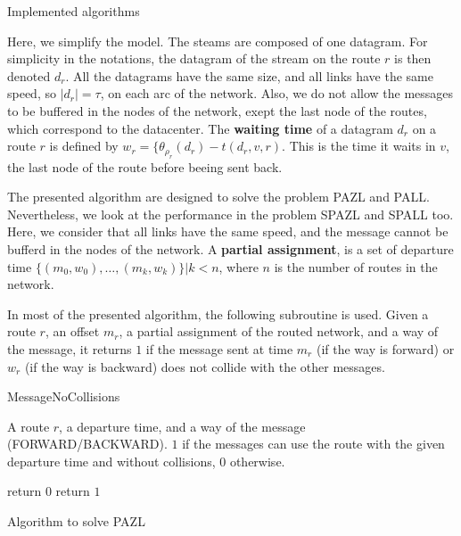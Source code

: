 \documentclass[10pt]{article}
\begin{document}
  \begin{section}{Implemented algorithms}
  
  \begin{subsection}
   Here, we simplify the model.
   The steams are composed of one datagram. For simplicity in the notations, the datagram of the stream on the route $r$ is then denoted $d_r$. All the datagrams have the same size, and all links have the same speed, so $|d_r| =\tau$, on each arc of the network.
   Also, we do not allow the messages to be buffered in the nodes of the network, exept the last node of the routes, which correspond to the datacenter.
   The \textbf{waiting time} of a datagram $d_r$ on a route $r$ is defined by $w_r = \{\theta_{\rho_r}(d_r) - t(d_r,v,r)$. This is the time it waits in $v$, the last node of the route before beeing sent back.
   
  \end{subsection}

  The presented algorithm are designed to solve the problem PAZL and PALL. Nevertheless, we look at the performance in the problem SPAZL and SPALL too.
  Here, we consider that all  links have the same speed, and the message cannot be bufferd in the nodes of the network. 
  A \textbf{partial assignment}, is a set of departure time $\{(m_0,w_0),\ldots,(m_k,w_k)\}|k<n$, where $n$ is the number of routes in the network.
  
   
   
  In most of the presented algorithm, the following subroutine is used. Given a route $r$, an offset $m_r$, a partial assignment of the routed network, and a way of the message, it returns $1$ if the message sent at time $m_r$ (if the way is forward) or $w_r$ (if the way is backward)  does not collide with the other messages. 
   	\begin{algorithm}[H]
 	\caption{MessageNoCollisions}
 	\begin{algorithmic}
 	\REQUIRE A route $r$, a departure time, and a way of the message (FORWARD/BACKWARD).
	\ENSURE $1$ if the messages can use the route with the given departure time and without collisions, $0$ otherwise.

 	\STATE return $0$
 	\ENDIF
 	\ENDFOR
	\STATE return $1$
 	\end{algorithmic}
 	\end{algorithm}
 	
  \begin{subsection}{Algorithm to solve PAZL }


\end{subsection}
\end{section}
\end{document}
